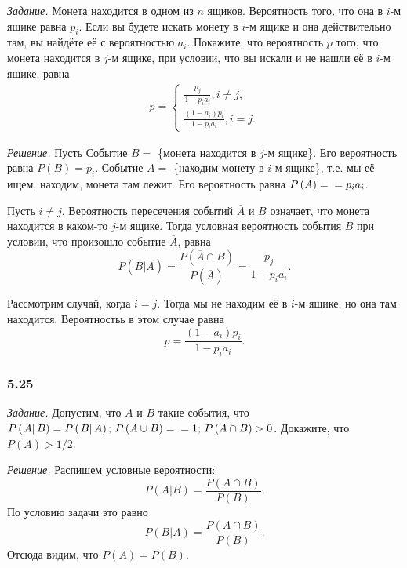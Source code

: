 \textit{Задание.} Монета находится в одном из $n$ ящиков.
Вероятность того, что она в $i$-м ящике равна $p_i$.
Если вы будете искать монету в $i$-м ящике и она действительно там, вы найдёте её с вероятностью $a_i$.
Покажите, что вероятность $p$ того, что монета находится в $j$-м ящике, при условии, что вы искали и не нашли её в $i$-м ящике, равна
\begin{equation*}
\begin{split}
p =
\begin{cases}
\frac{p_j}{1-p_i a_i}, i \neq j, \\
\frac{ \left( 1-a_i \right) p_i}{1-p_i a_i}, i = j.
\end{cases}
\end{split}
\end{equation*}

\textit{Решение.} Пусть Событие $B = $ \{монета находится в $j$-м ящике\}.
Его вероятность равна $P \left( B \right) = p_i$.
Событие $A =$ \{находим монету в $i$-м ящике\}, т.е. мы её ищем, находим, монета там лежит.
Его вероятность равна $P \left( A \right) = \\ = p_i a_i$.

Пусть $i \neq j$.
Вероятность пересечения событий $ \overline{A}$ и $B$ означает, что монета находится в каком-то $j$-м ящике.
Тогда условная вероятность события $B$ при условии, что произошло событие $ \overline{A}$, равна
$$P \left( \left. B \right| \overline{A} \right) =
\frac{P \left( \overline{A} \cap B \right) }{P \left( \overline{A} \right) } =
\frac{p_j}{1-p_i a_i}.$$

Рассмотрим случай, когда $i = j$.
Тогда мы не находим её в $i$-м ящике, но она там находится.
Вероятностьь в этом случае равна
$$p =
\frac{ \left( 1-a_i \right) p_i}{1-p_i a_i}.$$

\subsubsection*{5.25}

\textit{Задание.} Допустим, что $A$ и $B$ такие события, что
$P \left( \left. A \right| B \right) = P \left( \left. B \right| A \right); \,
P \left( A \cup B \right) = \\
= 1; \,
P \left( A \cap B \right) > 0$.
Докажите, что $P \left( A \right) > 1/2$.

\textit{Решение.} Распишем условные вероятности:
$$P \left( \left. A \right| B \right) =
\frac{P \left( A \cap B \right) }{P \left( B \right) }.$$
По условию задачи это равно
$$P \left( \left. B \right| A \right) =
\frac{P \left( A \cap B \right) }{P \left( B \right) }.$$
Отсюда видим, что $P \left( A \right) = P \left( B \right) $.

